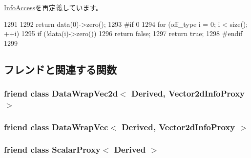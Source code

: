 \hyperlink{classStats_1_1InfoAccess_a4e72b01b727d3165e75cba84eb507491}{InfoAccess}を再定義しています。


\begin{DoxyCode}
1291     {
1292         return data(0)->zero();
1293 #if 0
1294         for (off_type i = 0; i < size(); ++i)
1295             if (!data(i)->zero())
1296                 return false;
1297         return true;
1298 #endif
1299     }
\end{DoxyCode}


\subsection{フレンドと関連する関数}
\hypertarget{classStats_1_1Vector2dBase_a8a0ac0473edb366d128fff87d8ce7994}{
\subsubsection[{DataWrapVec2d$<$ Derived, Vector2dInfoProxy $>$}]{\setlength{\rightskip}{0pt plus 5cm}friend class {\bf DataWrapVec2d}$<$ Derived, {\bf Vector2dInfoProxy} $>$}}
\label{classStats_1_1Vector2dBase_a8a0ac0473edb366d128fff87d8ce7994}
\hypertarget{classStats_1_1Vector2dBase_acbe1926908b84a880845fc330f5e33d0}{
\subsubsection[{DataWrapVec$<$ Derived, Vector2dInfoProxy $>$}]{\setlength{\rightskip}{0pt plus 5cm}friend class {\bf DataWrapVec}$<$ Derived, {\bf Vector2dInfoProxy} $>$}}
\label{classStats_1_1Vector2dBase_acbe1926908b84a880845fc330f5e33d0}
\hypertarget{classStats_1_1Vector2dBase_a339d5293ff5abbd173dd47aa666bb3c4}{
\subsubsection[{ScalarProxy$<$ Derived $>$}]{\setlength{\rightskip}{0pt plus 5cm}friend class {\bf ScalarProxy}$<$ Derived $>$}}
